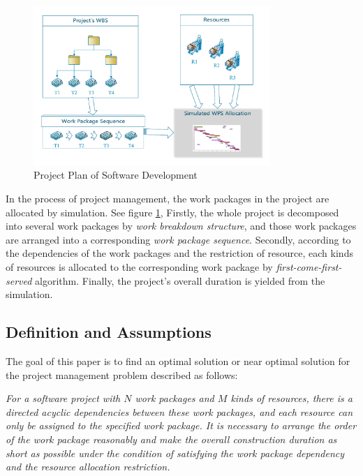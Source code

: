 \begin{figure}[!ht]
  \centering
  \vspace{-3mm}
  \includegraphics[width=0.8\textwidth]{figures/simu.pdf}
  \vspace{-5mm}
  \caption{Project Plan of Software Development}
  \label{fig:simu}
\vspace{-5mm}
\end{figure}


 In the process of project management, the work packages in the project are
 allocated by simulation. See figure \ref{fig:simu}, Firstly, the whole project
 is decomposed into several work packages by \emph{work breakdown structure},
 and those work packages are arranged into a corresponding \emph{work package
   sequence}. Secondly, according to the dependencies of the work packages and
 the restriction of resource, each kinds of resources is allocated to the
 corresponding work package by \emph{first-come-first-served}
 algorithm. Finally, the project's overall duration is yielded from the simulation.



\subsection{Definition and Assumptions}
%
The goal of this paper is to find an optimal solution or near optimal
solution for the project management problem described as follows:


\emph{
  For a software project with $N$ work packages and $M$ kinds of resources,
  there is a directed acyclic dependencies between these work packages, and each
  resource can only be assigned to the specified work package.  It is necessary
  to arrange the order of the work package reasonably and make the overall
  construction duration as short as possible under the condition of satisfying
  the work package dependency and the resource allocation restriction.
}

